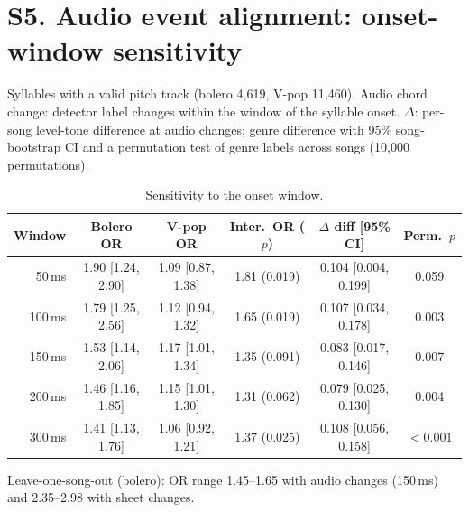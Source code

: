 \documentclass[11pt]{article}
\begin{document}
\section*{S5. Audio event alignment: onset-window sensitivity}
Syllables with a valid pitch track (bolero 4{,}619{,} V-pop 11,460). Audio chord change: detector label changes within the window of the syllable onset. $\Delta$: per-song level-tone difference at audio changes; genre difference with 95\% song-bootstrap CI and a permutation test of genre labels across songs (10{,}000 permutations).
\begin{table}[H]\centering\caption{Sensitivity to the onset window.}\footnotesize
\begin{tabular}{rccccc}\toprule Window & Bolero OR & V-pop OR & Inter.\ OR ($p$) & $\Delta$ diff [95\% CI] & Perm.\ $p$\\\midrule
50\,ms & 1.90 [1.24, 2.90] & 1.09 [0.87, 1.38] & 1.81 (0.019) & 0.104 [0.004, 0.199] & 0.059\\
100\,ms & 1.79 [1.25, 2.56] & 1.12 [0.94, 1.32] & 1.65 (0.019) & 0.107 [0.034, 0.178] & 0.003\\
150\,ms & 1.53 [1.14, 2.06] & 1.17 [1.01, 1.34] & 1.35 (0.091) & 0.083 [0.017, 0.146] & 0.007\\
200\,ms & 1.46 [1.16, 1.85] & 1.15 [1.01, 1.30] & 1.31 (0.062) & 0.079 [0.025, 0.130] & 0.004\\
300\,ms & 1.41 [1.13, 1.76] & 1.06 [0.92, 1.21] & 1.37 (0.025) & 0.108 [0.056, 0.158] & $<0.001$\\
\bottomrule\end{tabular}\end{table}
Leave-one-song-out (bolero): OR range 1.45--1.65 with audio changes (150\,ms) and 2.35--2.98 with sheet changes.
\end{document}
